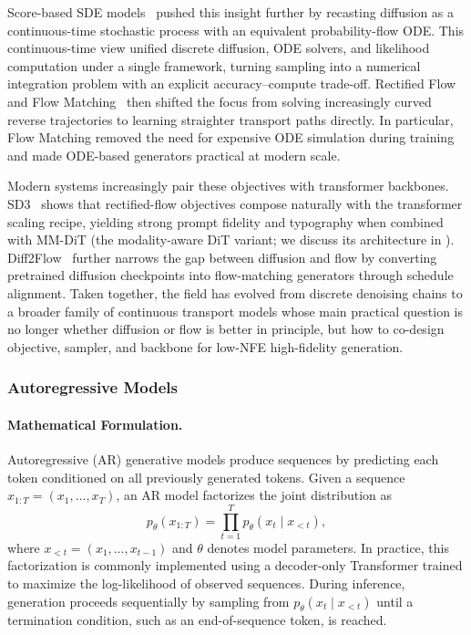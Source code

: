 Score-based SDE models~\citep{song2021scorebasedgenerativemodelingstochastic} pushed this insight further by recasting diffusion as a continuous-time stochastic process with an equivalent probability-flow ODE. This continuous-time view unified discrete diffusion, ODE solvers, and likelihood computation under a single framework, turning sampling into a numerical integration problem with an explicit accuracy--compute trade-off. Rectified Flow~\citep{liu2022flow} and Flow Matching~\citep{lipman2023flowmatchinggenerativemodeling} then shifted the focus from solving increasingly curved reverse trajectories to learning straighter transport paths directly. In particular, Flow Matching removed the need for expensive ODE simulation during training and made ODE-based generators practical at modern scale.

Modern systems increasingly pair these objectives with transformer backbones. SD3~\citep{esser2024stablediffusion3} shows that rectified-flow objectives compose naturally with the transformer scaling recipe, yielding strong prompt fidelity and typography when combined with MM-DiT (the modality-aware DiT variant; we discuss its architecture in ). Diff2Flow~\citep{schusterbauer2025diff2flowtrainingflowmatching} further narrows the gap between diffusion and flow by converting pretrained diffusion checkpoints into flow-matching generators through schedule alignment. Taken together, the field has evolved from discrete denoising chains to a broader family of continuous transport models whose main practical question is no longer whether diffusion or flow is better in principle, but how to co-design objective, sampler, and backbone for low-NFE high-fidelity generation.



\subsubsection{Autoregressive Models}

\paragraph{Mathematical Formulation.}
Autoregressive (AR) generative models produce sequences by predicting each token conditioned on all previously generated tokens. Given a sequence $x_{1:T} = (x_1, \ldots, x_T)$, an AR model factorizes the joint distribution as
\begin{equation}
p_\theta(x_{1:T}) = \prod_{t=1}^T p_\theta(x_t \mid x_{<t}),
\end{equation}
where $x_{<t} = (x_1, \ldots, x_{t-1})$ and $\theta$ denotes model parameters. In practice, this factorization is commonly implemented using a decoder-only Transformer trained to maximize the log-likelihood of observed sequences. During inference, generation proceeds sequentially by sampling from $p_\theta(x_t \mid x_{<t})$ until a termination condition, such as an end-of-sequence token, is reached.

